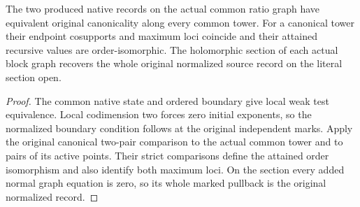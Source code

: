 \begin{theorem}
\label{hir:g1-intrinsic-ratio-canonical-comparison}
\leanok
The two produced native records on the actual common ratio graph
have equivalent original canonicality along every common tower.
For a canonical tower their endpoint cosupports and maximum loci
coincide and their attained recursive values are order-isomorphic.
The holomorphic section of each actual block graph recovers the
whole original normalized source record on the literal section open.
\end{theorem}
\begin{proof}
The common native state and ordered boundary give local weak test
equivalence. Local codimension two forces zero initial exponents,
so the normalized boundary condition follows at the original
independent marks. Apply the original canonical two-pair
comparison to the actual common tower and to pairs of its
active points. Their strict comparisons define the attained
order isomorphism and also identify both maximum loci. On the
section every added normal graph equation is zero, so its whole
marked pullback is the original normalized record.
\end{proof}

